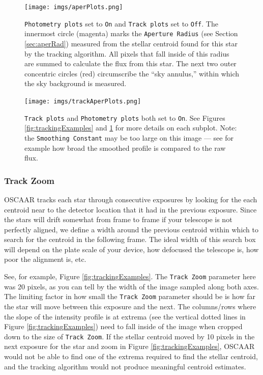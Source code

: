 \documentclass[a4paper]{article}
\newcommand{\code}[1]{\texttt{#1}}
\begin{document}
\begin{figure}[H]
\begin{center}
\texttt{[image: imgs/aperPlots.png]}
\caption{\code{Photometry plots} set to \code{On} and \code{Track plots} set to \code{Off}. The innermost circle (magenta) marks the \code{Aperture Radius} (see Section \ref{sec:aperRad}) measured from the stellar centroid found for this star by the tracking algorithm. All pixels that fall inside of this radius are summed to calculate the flux from this star. The next two outer concentric circles (red) circumscribe the ``sky annulus,'' within which the sky background is measured. }
\label{fig:photPlots}
\end{center}	
\end{figure}

\begin{figure}[H]
\begin{center}
\texttt{[image: imgs/trackAperPlots.png]}
\caption{\code{Track plots} and \code{Photometry plots} both set to \code{On}. See Figures \ref{fig:trackingExamples} and \ref{fig:photPlots} for more details on each subplot. Note: the \code{Smoothing Constant} may be too large on this image --- see for example how broad the smoothed profile is compared to the raw flux. }
\label{fig:trackAndPhotPlot}
\end{center}	
\end{figure}

\subsubsection{Track Zoom}
OSCAAR tracks each star through consecutive exposures by looking for the each centroid near to the detector location that it had in the previous exposure. Since the stars will drift somewhat from frame to frame if your telescope is not perfectly aligned, we define a width around the previous centroid within which to search for the centroid in the following frame. The ideal width of this search box will depend on the plate scale of your device, how defocused the telescope is, how poor the alignment is, etc. 

See, for example, Figure \ref{fig:trackingExamples}. The \code{Track Zoom} parameter here was 20 pixels, as you can tell by the width of the image sampled along both axes. The limiting factor in how small the \code{Track Zoom} parameter should be is how far the star will move between this exposure and the next. The columns/rows where the slope of the intensity profile is at extrema (see the vertical dotted lines in Figure \ref{fig:trackingExamples}) need to fall inside of the image when cropped down to the size of \code{Track Zoom}. If the stellar centroid moved by 10 pixels in the next exposure for the star and zoom in Figure \ref{fig:trackingExamples}, OSCAAR would not be able to find one of the extrema required to find the stellar centroid, and the tracking algorithm would not produce meaningful centroid estimates.
\end{document}
